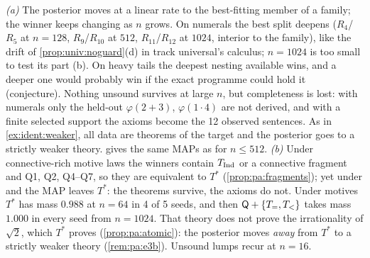 \noindent\emph{(a)} The posterior moves at a linear rate to the best-fitting member of a family; the winner keeps changing as $n$ grows. On numerals the best split deepens ($R_4$/$R_5$ at $n=128$, $R_9$/$R_{10}$ at $512$, $R_{11}$/$R_{12}$ at $1024$, interior to the family), like the drift of \cref{prop:univ:noguard}(d) in track universal's calculus; $n=1024$ is too small to test its part (b). On heavy tails the deepest nesting available wins, and a deeper one would probably win if the exact programme could hold it (conjecture). Nothing unsound survives at large $n$, but completeness is lost: with numerals only the held-out $\varphi(2+3)$, $\varphi(1\cdot4)$ are not derived, and with a finite selected support the axioms become the 12 observed sentences. As in \cref{ex:ident:weaker}, all data are theorems of the target and the posterior goes to a strictly weaker theory. \Lone{} gives the same MAPs as \Lzero{} for $n\le512$.
\emph{(b)} Under connective-rich motive laws the winners contain $T_{\mathrm{Ind}}$ or a connective fragment and Q1, Q2, Q4--Q7, so they are equivalent to $T^*$ (\cref{prop:pa:fragments}); yet under  and  the MAP leaves $T^*$: the theorems survive, the axioms do not. Under  motives $T^*$ has mass $0.988$ at $n=64$ in 4 of 5 seeds, and then $\mathsf{Q}+\{T_=,T_<\}$ takes mass $1.000$ in every seed from $n=1024$. That theory does not prove the irrationality of $\sqrt2$, which $T^*$ proves (\cref{prop:pa:atomic}): the posterior moves \emph{away} from $T^*$ to a strictly weaker theory (\cref{rem:pa:e3b}). Unsound lumps recur at $n=16$.


